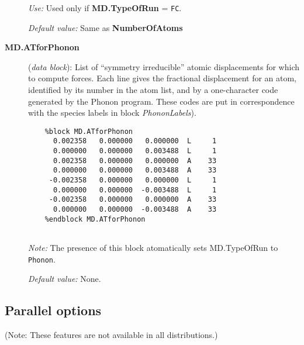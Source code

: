 \documentclass[11pt]{article}
\begin{document}
\begin{description}
{\it Use:} Used only if {\bf MD.TypeOfRun} = {\tt FC}.

{\it Default value:}  Same as {\bf NumberOfAtoms}

\item[{\bf MD.ATforPhonon}] ({\it data block}): List of ``symmetry
irreducible'' atomic displacements for which to compute forces. Each
line gives the fractional displacement for an atom, identified by its
number in the atom list, and by a one-character code generated by the
{\sc Phonon} program. These codes are put in correspondence with the
species labels in block \hbox{\it PhononLabels}).

\begin{verbatim}
    %block MD.ATforPhonon
      0.002358   0.000000   0.000000  L     1
      0.000000   0.000000   0.003488  L     1
      0.002358   0.000000   0.000000  A    33
      0.000000   0.000000   0.003488  A    33
     -0.002358   0.000000   0.000000  L     1
      0.000000   0.000000  -0.003488  L     1
     -0.002358   0.000000   0.000000  A    33
      0.000000   0.000000  -0.003488  A    33
    %endblock MD.ATforPhonon
  
\end{verbatim}

{\it Note:} The presence of this block 
atomatically sets MD.TypeOfRun to {\tt Phonon}.
 
{\it Default value:} None.

\end{description}


\vspace{5pt}
\subsection{Parallel options}

(Note: These features are not available in all distributions.)
\end{document}
